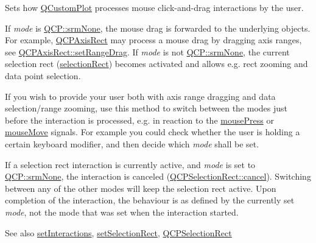 Sets how \mbox{\hyperlink{class_q_custom_plot}{Q\+Custom\+Plot}} processes mouse click-\/and-\/drag interactions by the user.

If {\itshape mode} is \mbox{\hyperlink{namespace_q_c_p_ac9aa4d6d81ac76b094f9af9ad2d3aacfa9032f170490d67240a6c68c2638ffab1}{Q\+C\+P\+::srm\+None}}, the mouse drag is forwarded to the underlying objects. For example, \mbox{\hyperlink{class_q_c_p_axis_rect}{Q\+C\+P\+Axis\+Rect}} may process a mouse drag by dragging axis ranges, see \mbox{\hyperlink{class_q_c_p_axis_rect_ae6aef2f7211ba6097c925dcd26008418}{Q\+C\+P\+Axis\+Rect\+::set\+Range\+Drag}}. If {\itshape mode} is not \mbox{\hyperlink{namespace_q_c_p_ac9aa4d6d81ac76b094f9af9ad2d3aacfa9032f170490d67240a6c68c2638ffab1}{Q\+C\+P\+::srm\+None}}, the current selection rect (\mbox{\hyperlink{class_q_custom_plot_ad7df2bcbba307e644db383b449e31efd}{selection\+Rect}}) becomes activated and allows e.\+g. rect zooming and data point selection.

If you wish to provide your user both with axis range dragging and data selection/range zooming, use this method to switch between the modes just before the interaction is processed, e.\+g. in reaction to the \mbox{\hyperlink{class_q_custom_plot_aca75bf9afb5dd19349c375de2a87a051}{mouse\+Press}} or \mbox{\hyperlink{class_q_custom_plot_a742ca4f94688bed2a685fd8a56ce5704}{mouse\+Move}} signals. For example you could check whether the user is holding a certain keyboard modifier, and then decide which {\itshape mode} shall be set.

If a selection rect interaction is currently active, and {\itshape mode} is set to \mbox{\hyperlink{namespace_q_c_p_ac9aa4d6d81ac76b094f9af9ad2d3aacfa9032f170490d67240a6c68c2638ffab1}{Q\+C\+P\+::srm\+None}}, the interaction is canceled (\mbox{\hyperlink{class_q_c_p_selection_rect_af67bc58f4f5ce9a4dc420b9c42de235a}{Q\+C\+P\+Selection\+Rect\+::cancel}}). Switching between any of the other modes will keep the selection rect active. Upon completion of the interaction, the behaviour is as defined by the currently set {\itshape mode}, not the mode that was set when the interaction started.

\begin{DoxySeeAlso}{See also}
\mbox{\hyperlink{class_q_custom_plot_a5ee1e2f6ae27419deca53e75907c27e5}{set\+Interactions}}, \mbox{\hyperlink{class_q_custom_plot_a0c09f96df15faa4799ad7051bb16cf33}{set\+Selection\+Rect}}, \mbox{\hyperlink{class_q_c_p_selection_rect}{Q\+C\+P\+Selection\+Rect}} 
\end{DoxySeeAlso}
\mbox{\label{class_q_custom_plot_a4dc31241d7b09680950e19e5f971ed93}} 

